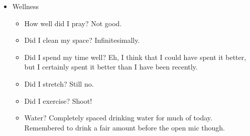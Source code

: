 \documentclass[12pt]{article}[titlepage]
\newcommand{\1}{\={a}}
\newcommand{\2}{\={e}}
\newcommand{\3}{\={\i}}
\newcommand{\4}{\=o}
\newcommand{\5}{\=u}
\newcommand{\6}{\={A}}
\renewcommand{\,}{\textsuperscript{,}}
\begin{document}
\begin{itemize}
\item Wellness
\begin{itemize}
\item How well did I pray? Not good.
\item Did I clean my space? Infinitesimally.
\item Did I spend my time well? Eh, I think that I could have spent it better, but I certainly spent it better than I have been recently.
\item Did I stretch? Still no.
\item Did I exercise? Shoot!
\item Water? Completely spaced drinking water for much of today. Remembered to drink a fair amount before the open mic though.
\end{itemize}
\end{itemize}
\end{document}
